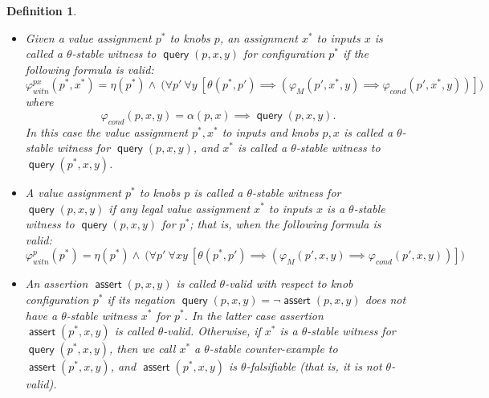 \documentclass[a4paper,parskip=half]{article} %
\newcommand*\eqdef=
\newcommand*\query{\operatorname{\mathsf{query}}}
\newcommand*\assert{\operatorname{\mathsf{assert}}}
\newtheorem{defn}[thm]{Definition}
\begin{document}
\begin{defn}\label{def:stable:witness:validity}
\begin{itemize}
\item Given a value assignment $p^*$ to knobs $p$, an assignment $x^*$ to inputs $x$ is called a \emph{$\theta$-stable witness} 
to $\query(p,x,y)$ for configuration $p^*$ if the following formula is valid:
\begin{equation}\label{form:gear:certify:knobs:inputs}
\varphi_{\mathit{witn}}^{px}(p^*,x^*) \eqdef
     \eta(p^*) \wedge ~\big(
    \forall p'~
    \forall y~[
   \theta(p^*, p') \implies (\varphi_M(p',x^*,y)  \implies  \varphi_{\mathit{cond}}(p',x^*,y))
    ]\big)
\end{equation}
where \[\varphi_{\mathit{cond}}(p,x,y) \eqdef \alpha(p,x) \implies \query(p,x,y).\]
In this case the value assignment $p^*, x^*$ to inputs and knobs $p,x$ is called a  \emph{$\theta$-stable witness for $\query(p,x,y)$}, 
and $x^*$ is called a  \emph{$\theta$-stable witness to $\query(p^*,x,y)$}.
\item A value assignment $p^*$ to knobs $p$ is called a  \emph{$\theta$-stable witness for $\query(p,x,y)$} if any legal value assignment 
$x^*$ to inputs $x$ is a $\theta$-stable witness to $\query(p,x,y)$ for $p^*$; that is, when the following formula is valid:
\begin{equation}\label{form:gear:certify:knobs}
\varphi_{\mathit{witn}}^{p}(p^*) \eqdef
     \eta(p^*) \wedge ~\big(
    \forall p'~
    \forall xy~[
   \theta(p^*, p') \implies (\varphi_M(p',x,y)  \implies  \varphi_{\mathit{cond}}(p',x,y))
    ]\big)
\end{equation}
\item An assertion $\assert(p, x,y)$ is called \emph{$\theta$-valid with respect to knob configuration $p^*$} if its negation 
$\query(p, x,y) \eqdef \neg \assert(p, x,y)$ does not have a $\theta$-stable witness $x^*$ for $p^*$.  In the latter case  
assertion $\assert(p^*, x,y)$ is called \emph{$\theta$-valid}. Otherwise, if $x^*$ is a  $\theta$-stable witness for 
$\query(p^*, x,y)$, then we call $x^*$  a \emph{$\theta$-stable counter-example to  $\assert(p^*, x,y)$}, and 
$\assert(p^*, x,y)$ is \emph{$\theta$-falsifiable} (that is, it is not $\theta$-valid).
\end{itemize}
\end{defn}
\end{document}
